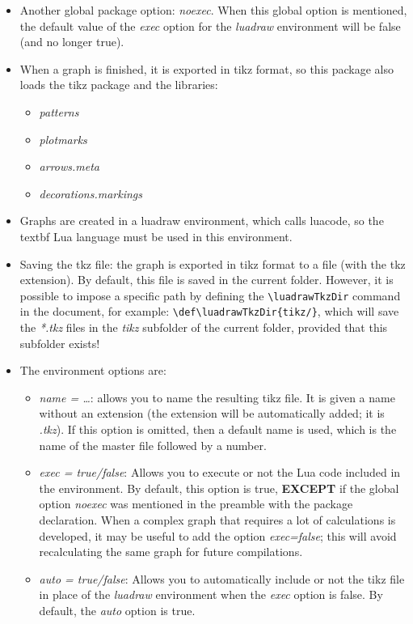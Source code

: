 \begin{itemize}
    \item Another global package option: \emph{noexec}. When this global option is mentioned, the default value of the \emph{exec} option for the \emph{luadraw} environment will be false (and no longer true).

    \item When a graph is finished, it is exported in tikz format, so this package also loads the tikz package and the libraries:

    \begin{itemize}
        \item\emph{patterns}
        \item\emph{plotmarks}
        \item\emph{arrows.meta}
        \item\emph{decorations.markings}
    \end{itemize}
    
    \item Graphs are created in a luadraw environment, which calls luacode, so the textbf Lua language must be used in this environment.

    \item Saving the tkz file: the graph is exported in tikz format to a file (with the tkz extension). By default, this file is saved in the current folder. However, it is possible to impose a specific path by defining the \verb|\luadrawTkzDir| command in the document, for example: \verb|\def\luadrawTkzDir{tikz/}|, which will save the \emph{*.tkz} files in the \emph{tikz} subfolder of the current folder, provided that this subfolder exists!

    \item The environment options are:
    
    \begin{itemize}
        \item \emph{name = \ldots{}}: allows you to name the resulting tikz file. It is given a name without an extension (the extension will be automatically added; it is \emph{.tkz}). If this option is omitted, then a default name is used, which is the name of the master file followed by a number.     \item \emph{exec = true/false}: Allows you to execute or not the Lua code included in the environment. By default, this option is true, \textbf{EXCEPT} if the global option \emph{noexec} was mentioned in the preamble with the package declaration. When a complex graph that requires a lot of calculations is developed, it may be useful to add the option \emph{exec=false}; this will avoid recalculating the same graph for future compilations.
        \item \emph{auto = true/false}: Allows you to automatically include or not the tikz file in place of the \emph{luadraw} environment when the \emph{exec} option is false. By default, the \emph{auto} option is true.
    \end{itemize}
\end{itemize}


